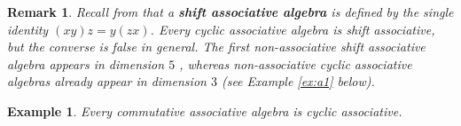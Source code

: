 \documentclass[pdflatex,sn-mathphys-num]{sn-jnl}%
\theoremstyle{thmstyleone}%
\newtheorem{proposition}[theorem]{Proposition}%
\newtheorem{example}{Example}[section]
\newtheorem{remark}{Remark}[section]
\theoremstyle{thmstyletwo}%
\theoremstyle{thmstylethree}%
\begin{document}
\begin{remark}
Recall from \cite{Abdelwahab2025} that a \textbf{shift associative algebra} is defined by the single identity $(xy)z = y(zx)$. Every cyclic associative algebra is shift associative, but the converse is false in general. The first non-associative shift associative algebra appears in dimension $5$ \cite[Proposition 59]{Abdelwahab2025}, whereas non-associative cyclic associative algebras already appear in dimension $3$ (see Example \ref{ex:a1} below).
\end{remark}

\begin{example}\label{ex:comm}
 Every commutative associative algebra is cyclic associative. 
\end{example}
\end{document}
